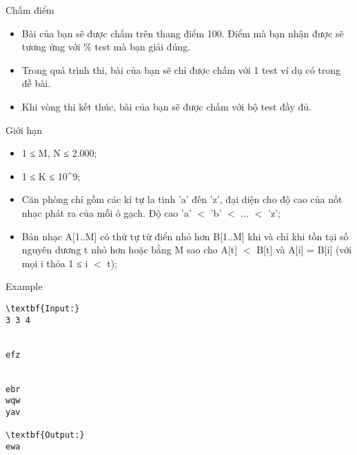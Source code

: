 Chấm điểm
\begin{itemize}
	\item     Bài của bạn sẽ được chấm trên thang điểm 100. Điểm mà bạn nhận được sẽ tương ứng với \% test mà bạn giải đúng.   
	\item     Trong quá trình thi, bài của bạn sẽ chỉ được chấm với 1 test ví dụ có trong đề bài.   
	\item     Khi vòng thi kết thúc, bài của bạn sẽ được chấm với bộ test đầy đủ.   
\end{itemize}
Giới hạn
\begin{itemize}
	\item     1 ≤ M, N ≤ 2.000;   
	\item     1 ≤ K ≤ 10^9;   
	\item     Căn phòng chỉ gồm các kí tự la tinh 'a' đến 'z', đại diện cho độ cao của nốt nhạc phát ra của mỗi ô gạch. Độ cao 'a' $<$ 'b' $<$ ... $<$ 'z';   
	\item     Bản nhạc A[1..M] có thứ tự từ điển nhỏ hơn B[1..M] khi và chỉ khi tồn tại số nguyên dương t nhỏ hơn hoặc bằng M sao cho A[t] $<$ B[t] và A[i] = B[i] (với mọi i thỏa 1 ≤ i $<$ t);   
\end{itemize}
\begin{itemize}
\end{itemize}
Example
\begin{verbatim}
\textbf{Input:}
3 3 4


efz


ebr
wqw
yav

\textbf{Output:}
ewa
\end{verbatim}